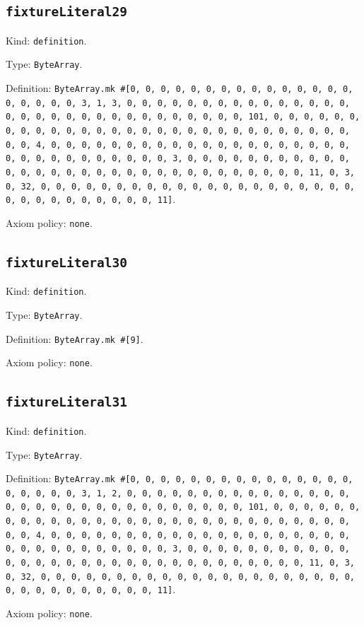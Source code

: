 \documentclass[11pt]{article}
\begin{document}
\subsection*{\texttt{fixtureLiteral29}}
\noindent Kind: \texttt{definition}.\par
\noindent Type: \texttt{ByteArray}.\par
\noindent Definition: \texttt{ByteArray.mk \#[0, 0, 0, 0, 0, 0, 0, 0, 0, 0, 0, 0, 0, 0, 0, 0, 0, 0, 0, 0, 3, 1, 3, 0, 0, 0, 0, 0, 0, 0, 0, 0, 0, 0, 0, 0, 0, 0, 0, 0, 0, 0, 0, 0, 0, 0, 0, 0, 0, 0, 0, 0, 0, 0, 101, 0, 0, 0, 0, 0, 0, 0, 0, 0, 0, 0, 0, 0, 0, 0, 0, 0, 0, 0, 0, 0, 0, 0, 0, 0, 0, 0, 0, 0, 0, 0, 4, 0, 0, 0, 0, 0, 0, 0, 0, 0, 0, 0, 0, 0, 0, 0, 0, 0, 0, 0, 0, 0, 0, 0, 0, 0, 0, 0, 0, 0, 0, 0, 3, 0, 0, 0, 0, 0, 0, 0, 0, 0, 0, 0, 0, 0, 0, 0, 0, 0, 0, 0, 0, 0, 0, 0, 0, 0, 0, 0, 0, 0, 0, 0, 11, 0, 3, 0, 32, 0, 0, 0, 0, 0, 0, 0, 0, 0, 0, 0, 0, 0, 0, 0, 0, 0, 0, 0, 0, 0, 0, 0, 0, 0, 0, 0, 0, 0, 0, 0, 11]}.\par
\noindent Axiom policy: \texttt{none}.\par
\subsection*{\texttt{fixtureLiteral30}}
\noindent Kind: \texttt{definition}.\par
\noindent Type: \texttt{ByteArray}.\par
\noindent Definition: \texttt{ByteArray.mk \#[9]}.\par
\noindent Axiom policy: \texttt{none}.\par
\subsection*{\texttt{fixtureLiteral31}}
\noindent Kind: \texttt{definition}.\par
\noindent Type: \texttt{ByteArray}.\par
\noindent Definition: \texttt{ByteArray.mk \#[0, 0, 0, 0, 0, 0, 0, 0, 0, 0, 0, 0, 0, 0, 0, 0, 0, 0, 0, 0, 3, 1, 2, 0, 0, 0, 0, 0, 0, 0, 0, 0, 0, 0, 0, 0, 0, 0, 0, 0, 0, 0, 0, 0, 0, 0, 0, 0, 0, 0, 0, 0, 0, 0, 101, 0, 0, 0, 0, 0, 0, 0, 0, 0, 0, 0, 0, 0, 0, 0, 0, 0, 0, 0, 0, 0, 0, 0, 0, 0, 0, 0, 0, 0, 0, 0, 4, 0, 0, 0, 0, 0, 0, 0, 0, 0, 0, 0, 0, 0, 0, 0, 0, 0, 0, 0, 0, 0, 0, 0, 0, 0, 0, 0, 0, 0, 0, 0, 3, 0, 0, 0, 0, 0, 0, 0, 0, 0, 0, 0, 0, 0, 0, 0, 0, 0, 0, 0, 0, 0, 0, 0, 0, 0, 0, 0, 0, 0, 0, 0, 11, 0, 3, 0, 32, 0, 0, 0, 0, 0, 0, 0, 0, 0, 0, 0, 0, 0, 0, 0, 0, 0, 0, 0, 0, 0, 0, 0, 0, 0, 0, 0, 0, 0, 0, 0, 11]}.\par
\noindent Axiom policy: \texttt{none}.\par
\end{document}
